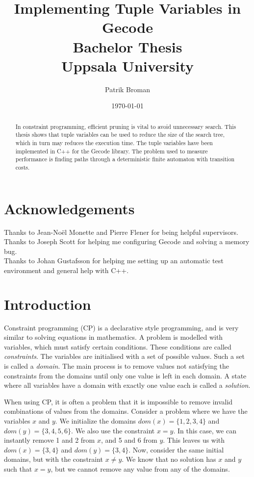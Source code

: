 \documentclass[a4paper,11pt]{article}
\title{\textbf{Implementing Tuple Variables in Gecode\\
	Bachelor Thesis \\
    Uppsala University  \\
  }
}
\author{Patrik Broman}
\date{\today}
\begin{document}
\maketitle
{}

\begin{abstract}

In constraint programming, efficient pruning is vital to avoid unnecessary search. This thesis shows that tuple variables can be used to reduce the size of the search tree, which in turn may reduces the execution time. The tuple variables have been implemented in C++ for the Gecode library. The problem used to measure performance is finding paths through a deterministic finite automaton with transition costs.

\end{abstract}

\setcounter{tocdepth}{2}
\tableofcontents
\pagestyle{plain}

\section*{Acknowledgements}
Thanks to Jean-No\"{e}l Monette and Pierre Flener for being helpful supervisors. \\
Thanks to Joseph Scott for helping me configuring Gecode and solving a memory bug. \\
Thanks to Johan Gustafsson for helping me setting up an automatic test environment and general help with C++. \\

\section{Introduction}
Constraint programming (CP) is a declarative style programming, and is very similar to solving equations in mathematics. A problem is modelled with variables, which must satisfy certain conditions. These conditions are called \textit{constraints}. The variables are initialised with a set of possible values. Such a set is called a \textit{domain}. The main process is to remove values not satisfying the constraints from the domains until only one value is left in each domain. A state where all variables have a domain with exactly one value each is called a \textit{solution}.

When using CP, it is often a problem that it is impossible to remove invalid combinations of values from the domains. Consider a problem where we have the variables $x$ and $y$. We initialize the domains $dom(x)=\{1,2,3,4\}$ and $dom(y)=\{3,4,5,6\}$. We also use the constraint $x=y$. In this case, we can instantly remove 1 and 2 from $x$, and 5 and 6 from $y$. This leaves us with $dom(x)=\{3,4\}$ and $dom(y)=\{3,4\}$. Now, consider the same initial domains, but with the constraint $x\neq y$. We know that no solution has $x$ and $y$ such that $x=y$, but we cannot remove any value from any of the domains. 
\end{document}
